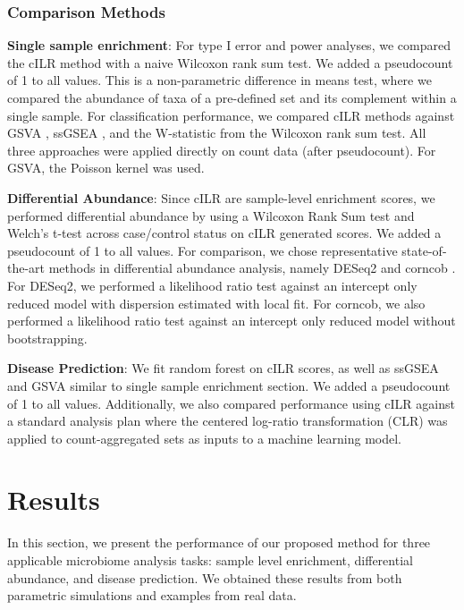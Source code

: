 \documentclass[10pt,letterpaper]{article}
\begin{document}
\subsubsection*{Comparison Methods}

\noindent \textbf{Single sample enrichment}: For type I error and power analyses, we compared the cILR method with a naive Wilcoxon rank sum test. We added a pseudocount of 1 to all values. This is a non-parametric difference in means test, where we compared the abundance of taxa of a pre-defined set and its complement within a single sample. For classification performance, we compared cILR methods against GSVA \cite{hanzelmann2013}, ssGSEA \cite{barbie2009}, and the W-statistic from the Wilcoxon rank sum test. All three approaches were applied directly on count data (after pseudocount). For GSVA, the Poisson kernel was used. 

\noindent \textbf{Differential Abundance}: Since cILR are sample-level enrichment scores, we performed differential abundance by using a Wilcoxon Rank Sum test and Welch's t-test across case/control status on cILR generated scores. We added a pseudocount of 1 to all values. For comparison, we chose representative state-of-the-art methods in differential abundance analysis, namely DESeq2 \cite{love2014,mcmurdie2014} and corncob \cite{martin2020}. For DESeq2, we performed a likelihood ratio test against an intercept only reduced model with dispersion estimated with local fit. For corncob, we also performed a likelihood ratio test against an intercept only reduced model without bootstrapping. 

\noindent \textbf{Disease Prediction}: We fit random forest on cILR scores, as well as ssGSEA \cite{hanzelmann2013} and GSVA \cite{barbie2009} similar to single sample enrichment section. We added a pseudocount of 1 to all values. Additionally, we also compared performance using cILR against a standard analysis plan where the centered log-ratio transformation (CLR) was applied to count-aggregated sets as inputs to a machine learning model. 

\section*{Results}
In this section, we present the performance of our proposed method for three applicable microbiome analysis tasks: sample level enrichment, differential abundance, and disease prediction. We obtained these results from both parametric simulations and examples from real data.  
\end{document}
